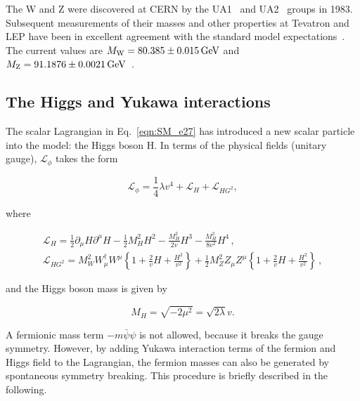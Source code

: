 The W and Z were discovered at CERN by the UA1~\cite{ARNISON1986484} and UA2~\cite{ANSARI1987440} groups in 1983.
Subsequent measurements of their masses and other properties at Tevatron and LEP have been in excellent agreement with the standard model expectations~\cite{Schael:2013ita,Aaltonen:2013iut}. The current values are $M_\mathrm{W} = 80.385 \pm 0.015\,\text{Ge\hspace{-.08em}V}$ and $M_\mathrm{Z} = 91.1876 \pm 0.0021\,\text{Ge\hspace{-.08em}V}$~\cite{Olive:2016xmw}.

\subsection{The Higgs and Yukawa interactions}\label{subsec:HiggsBoson}

The scalar Lagrangian in Eq.~\ref{eqn:SM_e27} has introduced a new scalar particle into the model: the Higgs boson H.
In terms of the physical fields (unitary gauge), $\mathcal{L}_\phi$ takes the form

\begin{equation}\label{eqn:SM_e36}
\mathcal{L}_\phi = \frac{1}{4}\lambda v^4 + \mathcal{L}_H + \mathcal{L}_{HG^2}, 
\end{equation}

\noindent where

\begin{equation}\label{eqn:SM_e37}
\begin{gathered}
\mathcal{L}_H = \frac{1}{2}\partial_\mu H\partial^\mu H - \frac{1}{2}M^2_HH^2 -\frac{M^2_H}{2v}H^3 -\frac{M^2_H}{8v^2}H^4 \, , \\
\mathcal{L}_{HG^2} = M^2_WW^\dag_\mu W^\mu \left\{ 1 + \frac{2}{v}H + \frac{H^2}{v^2} \right\} + \frac{1}{2}M^2_ZZ_\mu Z^\mu \left\{ 1 + \frac{2}{v}H + \frac{H^2}{v^2} \right\} \, ,
\end{gathered}
\end{equation}

\noindent and the Higgs boson mass is given by

\begin{equation}\label{eqn:SM_e38}
M_H = \sqrt{-2\mu^2} = \sqrt{2\lambda}v.
\end{equation}
 
A fermionic mass term $-m\bar{\psi}\psi$ is not allowed, because it breaks the gauge symmetry.
However, by adding Yukawa interaction terms of the fermion and Higgs field to the Lagrangian, the fermion masses can also be generated by spontaneous symmetry breaking.
This procedure is briefly described in the following.


